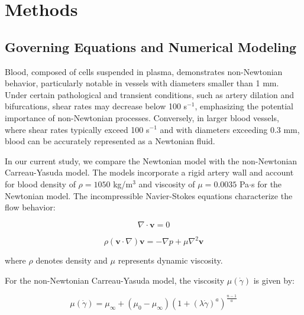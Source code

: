 \documentclass[12pt,a4paper]{article}
\begin{document}
\section{Methods}

\subsection{Governing Equations and Numerical Modeling}

Blood, composed of cells suspended in plasma, demonstrates non-Newtonian behavior, particularly notable in vessels with diameters smaller than 1 mm. Under certain pathological and transient conditions, such as artery dilation and bifurcations, shear rates may decrease below 100 s$^{-1}$, emphasizing the potential importance of non-Newtonian processes. Conversely, in larger blood vessels, where shear rates typically exceed 100 s$^{-1}$ and with diameters exceeding 0.3 mm, blood can be accurately represented as a Newtonian fluid.

In our current study, we compare the Newtonian model with the non-Newtonian Carreau-Yasuda model. The models incorporate a rigid artery wall and account for blood density of $\rho = 1050$ kg/m$^3$ and viscosity of $\mu = 0.0035$ Pa$\cdot$s for the Newtonian model. The incompressible Navier-Stokes equations characterize the flow behavior:

\begin{equation}
    \nabla \cdot \mathbf{v} = 0
    \label{eq:continuity}
\end{equation}

\begin{equation}
    \rho(\mathbf{v} \cdot \nabla)\mathbf{v} = -\nabla p + \mu \nabla^2 \mathbf{v}
    \label{eq:navier_stokes}
\end{equation}

\noindent where $\rho$ denotes density and $\mu$ represents dynamic viscosity.

For the non-Newtonian Carreau-Yasuda model, the viscosity $\mu(\dot{\gamma})$ is given by:

\begin{equation}
    \mu(\dot{\gamma}) = \mu_\infty + (\mu_0 - \mu_\infty) \left(1 + (\lambda \dot{\gamma})^a\right)^{\frac{n-1}{a}}
    \label{eq:carreau_yasuda}
\end{equation}
\end{document}
